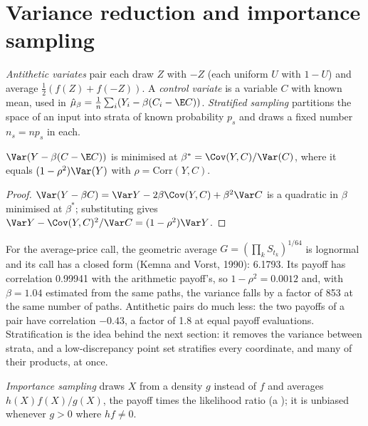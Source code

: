 \section{Variance reduction and importance sampling}

\begin{definition}\label{def:qm:monte-carlo:vr}
\emph{Antithetic variates} pair each draw $Z$ with $-Z$ (each uniform $U$ with $1 - U$) and average $\frac12(f(Z) + f(-Z))$. A \emph{control variate} is a variable $C$ with known mean, used in $\hat\mu_\beta = \frac1n\sum_i(Y_i - \beta(C_i - \E C))$. \emph{Stratified sampling} partitions the space of an input into
strata of known probability $p_s$ and draws a fixed number $n_s = np_s$ in each.
\end{definition}

\begin{proposition}\label{prop:qm:monte-carlo:cv}
$\Var(Y - \beta(C - \E C))$ is minimised at $\beta^* = \Cov(Y, C)/\Var(C)$, where it equals $(1 - \rho^2)\Var(Y)$ with $\rho = \mathrm{Corr}(Y, C)$.
\end{proposition}

\begin{proof}
$\Var(Y - \beta C) = \Var Y - 2\beta\Cov(Y, C) + \beta^2\Var C$ is a quadratic in $\beta$ minimised at $\beta^*$; substituting gives $\Var Y - \Cov(Y, C)^2/\Var C = (1 - \rho^2)\Var Y$.
\end{proof}

For the average-price call, the geometric average $G = (\prod_kS_{t_k})^{1/64}$ is lognormal and its call has a closed form (Kemna and Vorst, 1990): 6.1793. Its payoff has correlation 0.99941 with the
arithmetic payoff's, so $1 - \rho^2 = 0.0012$ and, with $\beta = 1.04$ estimated from the same paths, the variance falls by a factor of 853 at the same number of paths. Antithetic pairs do much less:
the two payoffs of a pair have correlation $-0.43$, a factor of 1.8 at equal payoff evaluations. Stratification is the idea behind the next section: it removes the variance between strata, and a
low-discrepancy point set stratifies every coordinate, and many of their products, at once.

\begin{definition}\label{def:qm:monte-carlo:is}
\emph{Importance sampling} draws $X$ from a density $g$ instead of $f$ and averages $h(X)f(X)/g(X)$, the payoff times the likelihood ratio (a );
it is unbiased whenever $g > 0$ where $hf \ne 0$.
\end{definition}


